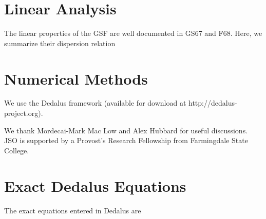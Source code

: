 \documentclass{jfm}
\begin{document}
\section{Linear Analysis}
\label{sec:linear}
The linear properties of the GSF are well documented in GS67 and
F68. Here, we summarize their dispersion relation 

\section{Numerical Methods}
\label{sec:numerical}
We use the Dedalus framework (available for download at
http://dedalus-project.org). 


We thank Mordecai-Mark Mac Low and Alex Hubbard for useful
discussions. JSO is supported by a Provost's Research Fellowship from
Farmingdale State College.
\appendix
\section{Exact Dedalus Equations}
\label{sec:appendix_dedalus}
The exact equations entered in Dedalus are 



\end{document}
